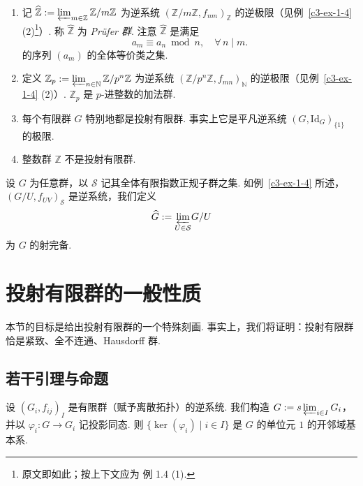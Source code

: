 \begin{examples}\label{c3-ex-1-11}
\
\begin{enumerate}[label=(\arabic*),leftmargin=*]
    \item 记 $\widehat{\mathbb{Z}}:=\varprojlim_{m\in\mathbb{Z}}\mathbb{Z}/m\mathbb{Z}$ 为逆系统 $(\mathbb{Z}/m\mathbb{Z},f_{nm})_{\mathbb{Z}}$ 的逆极限（见例~\ref{c3-ex-1-4} (2)\footnote{原文即如此；按上下文应为 例 1.4 (1).}）. 称 $\widehat{\mathbb{Z}}$ 为 \emph{Prüfer 群}. 注意 $\widehat{\mathbb{Z}}$ 是满足
    \[
    a_m\equiv a_n\bmod n,\quad\forall\, n\mid m.
    \]
    的序列 $(a_m)$ 的全体等价类之集.
    \item 定义 $\mathbb{Z}_p:=\varprojlim_{n\in\mathbb{N}}\mathbb{Z}/p^n\mathbb{Z}$ 为逆系统 $(\mathbb{Z}/p^n\mathbb{Z},f_{mn})_{\mathbb{N}}$ 的逆极限（见例~\ref{c3-ex-1-4} (2)）. $\mathbb{Z}_p$ 是 $p$-进整数的加法群.
    \item 每个有限群 $G$ 特别地都是投射有限群. 事实上它是平凡逆系统 $(G,\mathrm{Id}_G)_{\{1\}}$ 的极限.
    \item 整数群 $\mathbb{Z}$ 不是投射有限群.
\end{enumerate}
\end{examples}

\begin{definition}\label{c3-def-1-12}
设 $G$ 为任意群，以 $\mathcal{S}$ 记其全体有限指数正规子群之集. 如例~\ref{c3-ex-1-4} 所述，$(G/U,f_{UV})_{\mathcal{S}}$ 是逆系统，我们定义
\[
\widehat{G}:={\varprojlim_{U\in\mathcal{S}}}G/U
\]
为 $G$ 的射完备.
\end{definition}

\section{投射有限群的一般性质}

本节的目标是给出投射有限群的一个特殊刻画. 事实上，我们将证明：投射有限群恰是紧致、全不连通、Hausdorff 群.

\subsection{若干引理与命题}

\begin{proposition}\label{c3-prop-2-1}
设 $(G_i,f_{ij})_I$ 是有限群（赋予离散拓扑）的逆系统. 我们构造 $G:=s\varprojlim_{i\in I}G_i$，并以 $\varphi_i:G\to G_i$ 记投影同态. 则 $\{\ker(\varphi_i)\mid i\in I\}$ 是 $G$ 的单位元 $1$ 的开邻域基本系.
\end{proposition}

